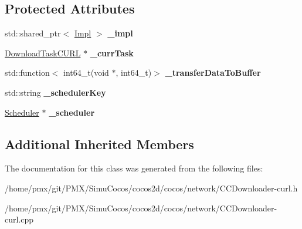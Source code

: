 \subsection*{Protected Attributes}
\begin{DoxyCompactItemize}
\item 
\mbox{\label{classcocos2d_1_1network_1_1DownloaderCURL_ac2cf73173e1a8cce17278fd7ff593bcb}} 
std\+::shared\+\_\+ptr$<$ \hyperlink{classcocos2d_1_1network_1_1DownloaderCURL_1_1Impl}{Impl} $>$ {\bfseries \+\_\+impl}
\item 
\mbox{\label{classcocos2d_1_1network_1_1DownloaderCURL_ab67049c2c4de4d10e4ea9f0c1e2fbc75}} 
\hyperlink{classcocos2d_1_1network_1_1DownloadTaskCURL}{Download\+Task\+C\+U\+RL} $\ast$ {\bfseries \+\_\+curr\+Task}
\item 
\mbox{\label{classcocos2d_1_1network_1_1DownloaderCURL_a6566b647020de927502a6471b9a32521}} 
std\+::function$<$ int64\+\_\+t(void $\ast$, int64\+\_\+t)$>$ {\bfseries \+\_\+transfer\+Data\+To\+Buffer}
\item 
\mbox{\label{classcocos2d_1_1network_1_1DownloaderCURL_a148e0fbcdc5d3c5ee929366a0cede655}} 
std\+::string {\bfseries \+\_\+scheduler\+Key}
\item 
\mbox{\label{classcocos2d_1_1network_1_1DownloaderCURL_a892449586f19ea2b339287f81d7b7963}} 
\hyperlink{classScheduler}{Scheduler} $\ast$ {\bfseries \+\_\+scheduler}
\end{DoxyCompactItemize}
\subsection*{Additional Inherited Members}


The documentation for this class was generated from the following files\+:\begin{DoxyCompactItemize}
\item 
/home/pmx/git/\+P\+M\+X/\+Simu\+Cocos/cocos2d/cocos/network/C\+C\+Downloader-\/curl.\+h\item 
/home/pmx/git/\+P\+M\+X/\+Simu\+Cocos/cocos2d/cocos/network/C\+C\+Downloader-\/curl.\+cpp\end{DoxyCompactItemize}
